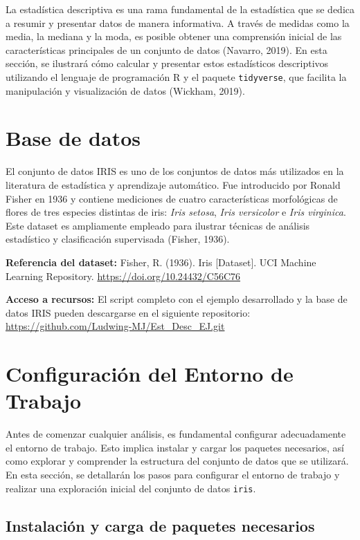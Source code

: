 \documentclass[
  spanish,
  a4paper,
  DIV=11,
  numbers=noendperiod,
  onepage,
  openany]{scrreprt}
\begin{document}
La estadística descriptiva es una rama fundamental de la estadística que
se dedica a resumir y presentar datos de manera informativa. A través de
medidas como la media, la mediana y la moda, es posible obtener una
comprensión inicial de las características principales de un conjunto de
datos (Navarro, 2019). En esta sección, se ilustrará cómo calcular y
presentar estos estadísticos descriptivos utilizando el lenguaje de
programación R y el paquete \texttt{tidyverse}, que facilita la
manipulación y visualización de datos (Wickham, 2019).

\section{Base de datos}\label{base-de-datos}

El conjunto de datos IRIS es uno de los conjuntos de datos más
utilizados en la literatura de estadística y aprendizaje automático. Fue
introducido por Ronald Fisher en 1936 y contiene mediciones de cuatro
características morfológicas de flores de tres especies distintas de
iris: \emph{Iris setosa}, \emph{Iris versicolor} e \emph{Iris
virginica}. Este dataset es ampliamente empleado para ilustrar técnicas
de análisis estadístico y clasificación supervisada (Fisher, 1936).

\textbf{Referencia del dataset:} Fisher, R. (1936). Iris {[}Dataset{]}.
UCI Machine Learning Repository. \url{https://doi.org/10.24432/C56C76}

\textbf{Acceso a recursos:} El script completo con el ejemplo
desarrollado y la base de datos IRIS pueden descargarse en el siguiente
repositorio: \url{https://github.com/Ludwing-MJ/Est_Desc_EJ.git}

\section{Configuración del Entorno de
Trabajo}\label{configuraciuxf3n-del-entorno-de-trabajo}

Antes de comenzar cualquier análisis, es fundamental configurar
adecuadamente el entorno de trabajo. Esto implica instalar y cargar los
paquetes necesarios, así como explorar y comprender la estructura del
conjunto de datos que se utilizará. En esta sección, se detallarán los
pasos para configurar el entorno de trabajo y realizar una exploración
inicial del conjunto de datos \texttt{iris}.

\subsection{Instalación y carga de paquetes
necesarios}\label{instalaciuxf3n-y-carga-de-paquetes-necesarios}
\end{document}
